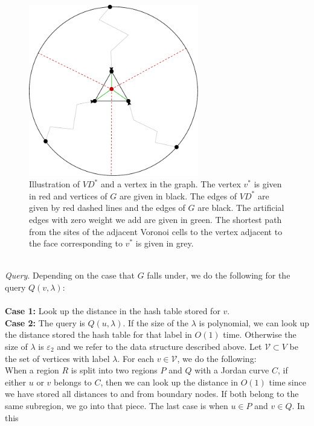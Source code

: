 \begin{figure}[h!]
  \centering
  \includegraphics[width=0.66\textwidth]{figs/vd2.pdf}
  \caption{Illustration of $VD^*$ and a vertex in the graph. The vertex $v^*$ is given in
  red and vertices of $G$ are given in black. The edges of $VD^*$ are given by red dashed
  lines and the edges
of $G$ are black. The artificial edges with zero weight we add are given in green. The
shortest path from the sites of the adjacent Voronoi cells to the vertex adjacent to the
face corresponding to $v^*$ is given in grey.}
    \label{vd2}
\end{figure}
\noindent \\
\indent \textit{Query}. Depending on the case that $G$ falls under, we do the following for the
query $Q(v, \lambda)$: \\
\\
\textbf{Case 1:} Look up the distance in the hash table stored for $v$. \\
\textbf{Case 2:} The query is $Q(u,\lambda)$. If the size of the $\lambda$ is polynomial,
we can look up the distance stored the hash table for that label in $O(1)$ time.
Otherwise the size of $\lambda$ is $\varepsilon_2$ and we refer to the data structure
described above. Let $\mathcal{V}\subset V$ be the set of vertices with label $\lambda$.
For each $v\in \mathcal{V}$, we do the following:\\
When a region $R$ is split into two regions $P$ and $Q$ with a Jordan curve $C$, if
either $u$ or $v$ belongs to $C$, then we can look up the distance in $O(1)$ time since
we have stored all distances to and from boundary nodes. If both belong to the same
subregion, we go into that piece. The last case is when $u\in P$ and $v\in Q$. In this

